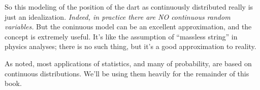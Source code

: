 So this modeling of the position of the dart as continuously distributed
really is just an idealization.  {\it Indeed, in practice there are NO
continuous random variables.}  But the coninuous model can be an
excellent approximation, and the concept is extremely useful.  It's like
the assumption of ``massless string'' in physics analyses; there is no
such thing, but it's a good approximation to reality.

As noted, most applications of statistics, and many of probability, are
based on continuous distributions.  We'll be using them heavily for the
remainder of this book.

